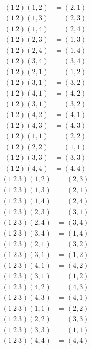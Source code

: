 \documentclass{article}
\begin{document}
\subsubsection{}\label{ex7p9}
\begin{align*}
(1\ 2)(1,2) &= (2,1)\\
(1\ 2)(1,3) &= (2,3)\\
(1\ 2)(1,4) &= (2,4)\\
(1\ 2)(2,3) &= (1,3)\\
(1\ 2)(2,4) &= (1,4)\\
(1\ 2)(3,4) &= (3,4)\\
(1\ 2)(2,1) &= (1,2)\\
(1\ 2)(3,1) &= (3,2)\\
(1\ 2)(4,1) &= (4,2)\\
(1\ 2)(3,1) &= (3,2)\\
(1\ 2)(4,2) &= (4,1)\\
(1\ 2)(4,3) &= (4,3)\\
(1\ 2)(1,1) &= (2,2)\\
(1\ 2)(2,2) &= (1,1)\\
(1\ 2)(3,3) &= (3,3)\\
(1\ 2)(4,4) &= (4,4)
\end{align*}
\begin{align*}
(1\ 2\ 3)(1,2) &= (2,3)\\
(1\ 2\ 3)(1,3) &= (2,1)\\
(1\ 2\ 3)(1,4) &= (2,4)\\
(1\ 2\ 3)(2,3) &= (3,1)\\
(1\ 2\ 3)(2,4) &= (3,4)\\
(1\ 2\ 3)(3,4) &= (1,4)\\
(1\ 2\ 3)(2,1) &= (3,2)\\
(1\ 2\ 3)(3,1) &= (1,2)\\
(1\ 2\ 3)(4,1) &= (4,2)\\
(1\ 2\ 3)(3,1) &= (1,2)\\
(1\ 2\ 3)(4,2) &= (4,3)\\
(1\ 2\ 3)(4,3) &= (4,1)\\
(1\ 2\ 3)(1,1) &= (2,2)\\
(1\ 2\ 3)(2,2) &= (3,3)\\
(1\ 2\ 3)(3,3) &= (1,1)\\
(1\ 2\ 3)(4,4) &= (4,4)
\end{align*}
\end{document}

